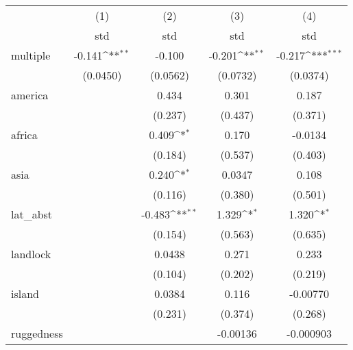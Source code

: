 {
\def\sym#1{\ifmmode^{#1}\else\(^{#1}\)\fi}
\begin{tabular}{l*{4}{c}}
\hline\hline
            &\multicolumn{1}{c}{(1)}&\multicolumn{1}{c}{(2)}&\multicolumn{1}{c}{(3)}&\multicolumn{1}{c}{(4)}\\
            &\multicolumn{1}{c}{std}&\multicolumn{1}{c}{std}&\multicolumn{1}{c}{std}&\multicolumn{1}{c}{std}\\
\hline
multiple    &      -0.141\sym{**} &      -0.100         &      -0.201\sym{**} &      -0.217\sym{***}\\
            &    (0.0450)         &    (0.0562)         &    (0.0732)         &    (0.0374)         \\
[1em]
america     &                     &       0.434         &       0.301         &       0.187         \\
            &                     &     (0.237)         &     (0.437)         &     (0.371)         \\
[1em]
africa      &                     &       0.409\sym{*}  &       0.170         &     -0.0134         \\
            &                     &     (0.184)         &     (0.537)         &     (0.403)         \\
[1em]
asia        &                     &       0.240\sym{*}  &      0.0347         &       0.108         \\
            &                     &     (0.116)         &     (0.380)         &     (0.501)         \\
[1em]
lat\_abst    &                     &      -0.483\sym{**} &       1.329\sym{*}  &       1.320\sym{*}  \\
            &                     &     (0.154)         &     (0.563)         &     (0.635)         \\
[1em]
landlock    &                     &      0.0438         &       0.271         &       0.233         \\
            &                     &     (0.104)         &     (0.202)         &     (0.219)         \\
[1em]
island      &                     &      0.0384         &       0.116         &    -0.00770         \\
            &                     &     (0.231)         &     (0.374)         &     (0.268)         \\
[1em]
ruggedness  &                     &                     &    -0.00136         &   -0.000903         \\

\end{tabular}}
